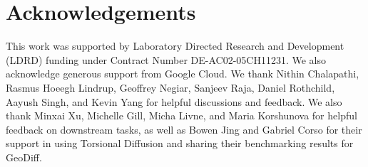 \section{Acknowledgements}
This work was supported by Laboratory Directed Research and Development (LDRD) funding under Contract Number DE-AC02-05CH11231. We also acknowledge generous support from Google Cloud. We thank Nithin Chalapathi, Rasmus Hoeegh Lindrup, Geoffrey Negiar, Sanjeev Raja, Daniel Rothchild, Aayush Singh, and Kevin Yang for helpful discussions and feedback. We also thank Minxai Xu, Michelle Gill, Micha Livne, and Maria Korshunova for helpful feedback on downstream tasks, as well as Bowen Jing and Gabriel Corso for their support in using Torsional Diffusion and sharing their benchmarking results for GeoDiff.
